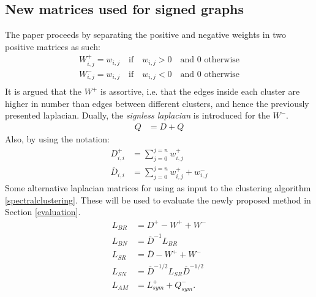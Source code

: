 \documentclass[11pt]{article}
\begin{document}
  \subsection{New matrices used for signed graphs}
  The paper proceeds by separating the positive and negative weights in two positive
  matrices as such: 
  \begin{align*}
    W^+_{i, j} = w_{i, j} \quad \textrm{if} \quad w_{i, j} > 0 \quad \textrm{and 0 otherwise} \\
    W^-_{i, j} = w_{i, j} \quad \textrm{if} \quad w_{i, j} < 0 \quad \textrm{and 0 otherwise} \\
  \end{align*}
  It is argued that the $W^+$ is assortive, i.e. that the edges inside each cluster 
  are higher in number than edges between different clusters, and hence \cite{} 
  the previously presented laplacian. Dually, the \emph{signless laplacian} is 
  introduced for the $W^-$. 
  \begin{align*}
    Q &= D + Q 
  \end{align*}
  Also, by using the notation: 
  \begin{align*}
    D^+_{i, i} &= \sum^{j=n}_{j=0} w^+_{i,j} \\
    \overset{\_}{D}_{i, i} &= \sum^{j=n}_{j=0} w^+_{i, j} + w^-_{i, j}
  \end{align*}
  Some alternative laplacian matrices for using as input to the 
  clustering algorithm \ref{spectralclustering}. These will be used to evaluate the 
  newly proposed method in Section \ref{evaluation}.
  \begin{align*}
    L_{BR} &= D^+ - W^+ + W^- \\
    L_{BN} &= \overset{\_}{D}^{-1}L_{BR}  \\
    L_{SR} &= \overset{\_}{D} - W^+ + W^- \\ 
    L_{SN} &= \overset{\_}{D}^{-1/2}L_{SR}\overset{\_}{D}^{-1/2} \\ 
    L_{AM} &= L^+_{sym} + Q^-_{sym}.
  \end{align*}
\end{document}
